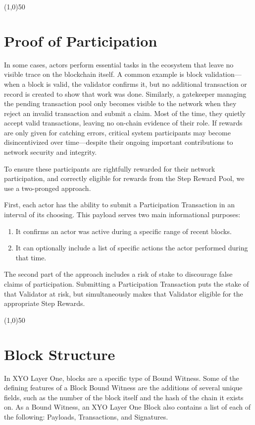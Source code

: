 \documentclass{article}
\begin{document}
\begin{center}
    \line(1,0){50}
\end{center}

\section{Proof of Participation}
In some cases, actors perform essential tasks in the ecosystem that leave no visible trace on the blockchain itself. A common example is block validation—when a block is valid, the validator confirms it, but no additional transaction or record is created to show that work was done. Similarly, a gatekeeper managing the pending transaction pool only becomes visible to the network when they reject an invalid transaction and submit a claim. Most of the time, they quietly accept valid transactions, leaving no on-chain evidence of their role. If rewards are only given for catching errors, critical system participants may become disincentivized over time—despite their ongoing important contributions to network security and integrity.

To ensure these participants are rightfully rewarded for their network participation, and correctly eligible for rewards from the Step Reward Pool, we use a two-pronged approach. 

First, each actor has the ability to submit a Participation Transaction in an interval of its choosing. This payload serves two main informational purposes:

\begin{enumerate}
    \item It confirms an actor was active during a specific range of recent blocks.
    \item It can optionally include a list of specific actions the actor performed during that time.
\end{enumerate}

The second part of the approach includes a risk of stake to discourage false claims of participation. Submitting a Participation Transaction puts the stake of that Validator at risk, but simultaneously makes that Validator eligible for the appropriate Step Rewards.

\begin{center}
    \line(1,0){50}
\end{center}
\section{Block Structure}
In XYO Layer One, blocks are a specific type of Bound Witness. Some of the defining features of a Block Bound Witness are the additions of several unique fields, such as the number of the block itself and the hash of the chain it exists on. 
As a Bound Witness, an XYO Layer One Block also contains a list of each of the following: Payloads, Transactions, and Signatures. 
\end{document}
